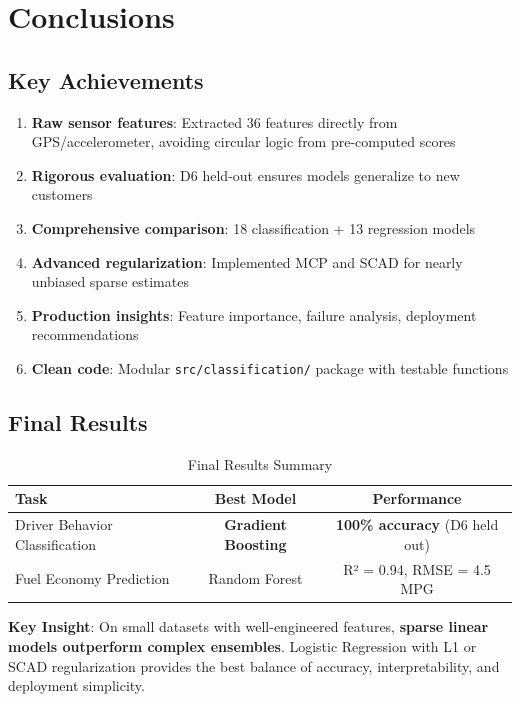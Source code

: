 \documentclass[11pt,a4paper]{article}
\begin{document}
\section{Conclusions}

\subsection{Key Achievements}

\begin{enumerate}[leftmargin=*]
    \item \textbf{Raw sensor features}: Extracted 36 features directly from GPS/accelerometer, avoiding circular logic from pre-computed scores
    \item \textbf{Rigorous evaluation}: D6 held-out ensures models generalize to new customers
    \item \textbf{Comprehensive comparison}: 18 classification + 13 regression models
    \item \textbf{Advanced regularization}: Implemented MCP and SCAD for nearly unbiased sparse estimates
    \item \textbf{Production insights}: Feature importance, failure analysis, deployment recommendations
    \item \textbf{Clean code}: Modular \texttt{src/classification/} package with testable functions
\end{enumerate}

\subsection{Final Results}

\begin{table}[H]
\centering
\caption{Final Results Summary}
\begin{tabular}{lcc}
\toprule
\textbf{Task} & \textbf{Best Model} & \textbf{Performance} \\
\midrule
Driver Behavior Classification & \textbf{Gradient Boosting} & \textbf{100\% accuracy} (D6 held out) \\
Fuel Economy Prediction & Random Forest & R² = 0.94, RMSE = 4.5 MPG \\
\bottomrule
\end{tabular}
\end{table}

\textbf{Key Insight}: On small datasets with well-engineered features, \textcolor{successgreen}{\textbf{sparse linear models outperform complex ensembles}}. Logistic Regression with L1 or SCAD regularization provides the best balance of accuracy, interpretability, and deployment simplicity.
\end{document}
